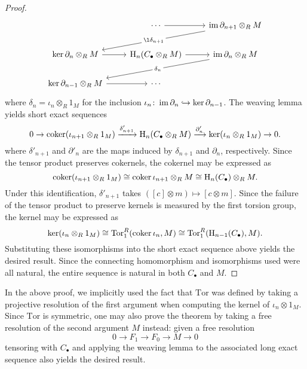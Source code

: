 \begin{proof}
\begin{equation*}
    \begin{tikzcd}
	& \cdots & {\im \partial_{n+1} \otimes_R M} \\
	{\ker \partial_n \otimes_R M} & {\mathrm{H}_n(C_\bullet \otimes_R M)} & {\im \partial_{n} \otimes_R M} \\
	{\ker \partial_{n-1} \otimes_R M} & \cdots
	\arrow[from=1-2, to=1-3]
	\arrow["{\l\delta_{n+1}}"{description}, from=1-3, to=2-1]
	\arrow[from=2-1, to=2-2]
	\arrow[from=2-2, to=2-3]
	\arrow["{\delta_n}"{description}, from=2-3, to=3-1]
	\arrow[from=3-1, to=3-2]
\end{tikzcd}
\end{equation*}
where $\delta_n = \iota_n \otimes_R 1_M$ for the inclusion $\iota_n \colon \operatorname{im} \partial_n \hookrightarrow \ker \partial_{n-1}$. The weaving lemma yields short exact sequences
\begin{equation*}
    0 \to \operatorname{coker} (\iota_{n+1} \otimes_R 1_M) \xrightarrow{\delta'_{n+1}} \mathrm{H}_n(C_\bullet \otimes_R M) \xrightarrow{\partial'_n} \ker(\iota_{n} \otimes_R 1_M) \to 0.
\end{equation*}
where $\delta'_{n+1}$ and $\partial'_n$ are the maps induced by $\delta_{n+1}$ and $\partial_n$, respectively. Since the tensor product preserves cokernels, the cokernel may be expressed as
\begin{equation*}
    \operatorname{coker} (\iota_{n+1} \otimes_R 1_M) \cong \operatorname{coker} \iota_{n+1} \otimes_R M \cong \mathrm{H}_n(C_\bullet) \otimes_R M.
\end{equation*}
Under this identification, $\delta'_{n+1}$ takes $([c] \otimes m) \mapsto [c \otimes m]$. Since the failure of the tensor product to preserve kernels is measured by the first torsion group, the kernel may be expressed as
\begin{equation*}
    \ker(\iota_n \otimes_R 1_M) \cong \mathrm{Tor}_1^R(\operatorname{coker} \iota_n, M) \cong \mathrm{Tor}_1^R(\mathrm{H}_{n-1}(C_\bullet), M).
\end{equation*}
Substituting these isomorphisms into the short exact sequence above yields the desired result. Since the connecting homomorphism and isomorphisms used were all natural, the entire sequence is natural in both $C_\bullet$ and $M$.
\end{proof}

\begin{remark}
    In the above proof, we implicitly used the fact that $\mathrm{Tor}$ was defined by taking a projective resolution of the first argument when computing the kernel of $\iota_n \otimes 1_M$. Since $\mathrm{Tor}$ is symmetric, one may also prove the theorem by taking a free resolution of the second argument $M$ instead: given a free resolution
    \begin{equation*}
        0 \to F_1 \to F_0 \to M \to 0
    \end{equation*}
    tensoring with $C_\bullet$ and applying the weaving lemma to the associated long exact sequence also yields the desired result.
\end{remark}

